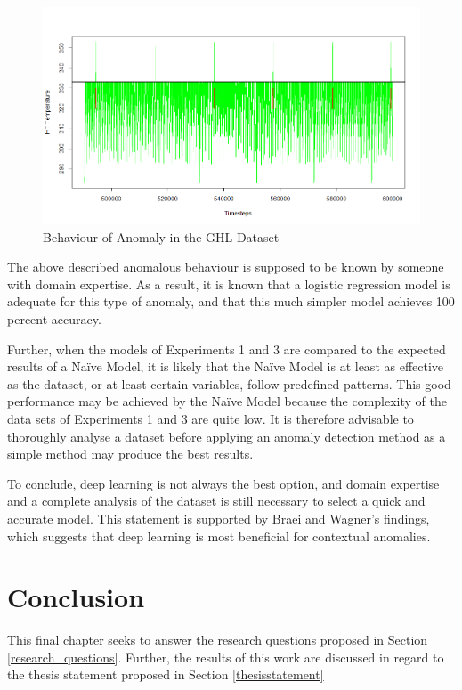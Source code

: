\begin{figure}[h]
	\centering
	\includegraphics[scale=0.45]{Figures/review}
	\decoRule
	\caption[Behaviour of Anomaly in the GHL Dataset]{Behaviour of Anomaly in the GHL Dataset \parencite{own}}
	\label{fig:review}
\end{figure}

The above described anomalous behaviour is supposed to be known by someone with domain expertise. As a result, it is known that a logistic regression model is adequate for this type of anomaly, and that this much simpler model achieves 100 percent accuracy. 

Further, when the models of Experiments 1 and 3 are compared to the expected results of a Naïve Model, it is likely that the Naïve Model is at least as effective as the dataset, or at least certain variables, follow predefined patterns. This good performance may be achieved by the Naïve Model because the complexity of the data sets of Experiments 1 and 3 are quite low. It is therefore advisable to thoroughly analyse a dataset before applying an anomaly detection method as a simple method may produce the best results.    

To conclude, deep learning is not always the best option, and domain expertise and a complete analysis of the dataset is still necessary to select a quick and accurate model. This statement is supported by Braei and Wagner's \parencite*{Braei2020} findings, which suggests that deep learning is most beneficial for contextual anomalies.   

\chapter{Conclusion}

This final chapter seeks to answer the research questions proposed in Section \ref{research_questions}. Further, the results of this work are discussed in regard to the thesis statement proposed in Section \ref{thesisstatement}


